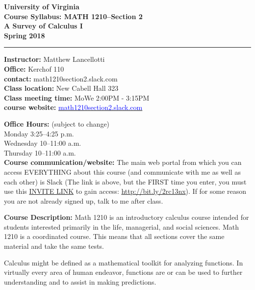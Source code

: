 \documentclass[11pt]{article}
\newcommand{\blue}[1]{\textcolor{blue}{#1}}
\newcommand{\vs}{\vspace{0.5cm}}
\begin{document}
\begin{center}
{\bf University of Virginia \\ Course Syllabus: MATH 1210--Section 2 \\ A Survey of Calculus I \\ Spring 2018}
\end{center}


\begin{flushleft}
\rule{\textwidth}{.01in}
\end{flushleft}

\begin{multicols}{2}
\noindent\textbf{Instructor:} Matthew Lancellotti \\
\noindent\textbf{Office:} Kerchof 110 \\
\noindent\textbf{contact:} math1210section2.slack.com \\
\noindent\textbf{Class location:} New Cabell Hall 323\\
\noindent\textbf{Class meeting time:} MoWe 2:00PM - 3:15PM \\
\noindent\textbf{course website:} \href{https://math1210section2.slack.com}{\blue{math1210section2.slack.com}}
\end{multicols}
\noindent\textbf{Office Hours:} (subject to change) \\
Monday 3:25--4:25 p.m. \\
Wednesday 10--11:00 a.m. \\
Thursday 10--11:00 a.m. \\

\vs\vs
\noindent\textbf{Course communication/website:}
The main web portal from which you can access EVERYTHING about this course (and communicate with me as well as each other) is Slack (The link is above, but the FIRST time you enter, you must use this \href{https://join.slack.com/t/math-1210-section-2/shared_invite/enQtMjk5NjMxNzUzNjUyLWVhMzYxZGU5MzcyMGE1NWUyMzRmNWU4ODU1N2RkMTRkMjlhM2VmODEzYTMxYzgwMzExNzY5NGUxMDBjMTc1NzM}{INVITE LINK} to gain access: \url{http://bit.ly/2rc13nx}).  If for some reason you are not already signed up, talk to me after class.



\vs
\noindent\textbf{Course Description:}
Math 1210 is an introductory calculus course intended for students interested primarily in the life, managerial, and social sciences. Math 1210 is a coordinated course. This means that all sections cover the same material and take the same tests.

Calculus might be defined as a mathematical toolkit for analyzing functions. In virtually every area of human endeavor, functions are or can be used to further understanding and to assist in making predictions.
\end{document}
